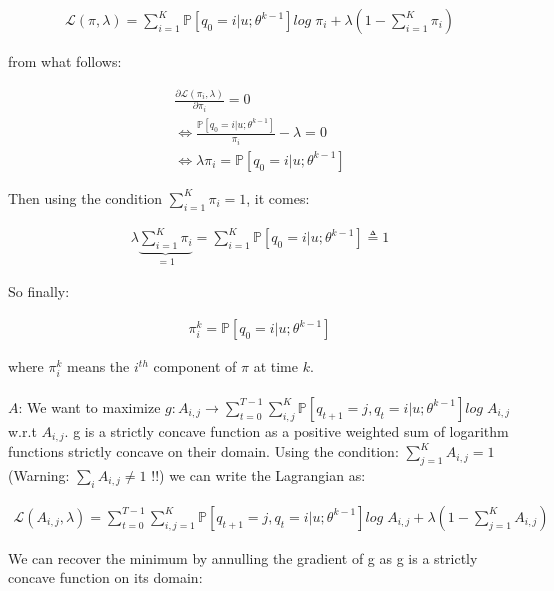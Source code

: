 \documentclass[11pt]{article}
\numberwithin{figure}{section} %
\begin{document}
\begin{align*}
\mathcal{L}(\pi, \lambda) = \sum\limits_{i=1}^K \mathbb{P}[q_0 = i | u; \theta^{k-1}] log \; \pi_i + \lambda \left(1 - \sum\limits_{i=1}^K \pi_i\right)
\end{align*}

from what follows:

\begin{align*}
\frac{\partial \mathcal{L}(\pi_i, \lambda)}{\partial \pi_i} = 0 \\
\Leftrightarrow \frac{\mathbb{P}[q_0 = i | u; \theta^{k-1}]}{\pi_i} - \lambda = 0 \\
\Leftrightarrow \lambda \pi_i = \mathbb{P}[q_0 = i | u; \theta^{k-1}]
\end{align*}

Then using the condition $\sum\limits_{i=1}^K \pi_i = 1$, it comes:

\begin{align*}
\lambda \underbrace{\sum\limits_{i=1}^K \pi_i}_{=1} = \sum\limits_{i=1}^K \mathbb{P}[q_0 = i | u; \theta^{k-1}] \triangleq 1
\end{align*}

So finally:

\begin{framed}
\begin{align*}
\pi^k_i = \mathbb{P}[q_0 = i | u; \theta^{k-1}]
\end{align*}
\end{framed}

where $\pi^k_i$ means the $i^{th}$ component of $\pi$ at time $k$. \\
\\

$A$: We want to maximize $g : A_{i,j} \rightarrow \sum\limits_{t=0}^{T-1} \sum\limits_{i,j}^K \mathbb{P}[q_{t+1} = j, q_t = i | u; \theta^{k-1}] log \; A_{i,j}$ w.r.t $A_{i,j}$. g
is a strictly concave function as a positive weighted sum of logarithm functions strictly concave on their domain. Using the condition: $\sum\limits_{j=1}^K A_{i,j} = 1$ (Warning: 
$\sum\limits_{i} A_{i,j} \neq 1$ !!) we can write the Lagrangian as:

\begin{align*}
\mathcal{L}(A_{i,j}, \lambda) = \sum\limits_{t=0}^{T-1} \sum\limits_{i,j = 1}^K \mathbb{P}[q_{t+1} = j, q_t = i | u; \theta^{k-1}] log \; A_{i,j} + \lambda(1 - \sum\limits_{j=1}^K A_{i,j})
\end{align*}

We can recover the minimum by annulling the gradient of g as g is a strictly concave function on its domain:
\end{document}
